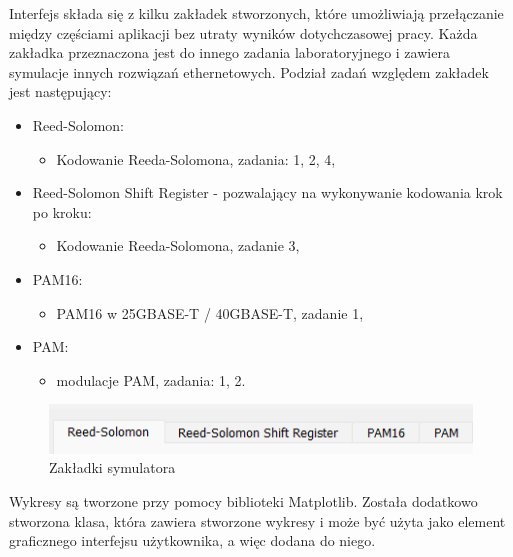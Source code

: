 Interfejs składa się z kilku zakładek stworzonych, które umożliwiają przełączanie między częściami aplikacji bez utraty wyników dotychczasowej pracy. Każda zakładka przeznaczona jest do innego zadania laboratoryjnego i zawiera symulacje innych rozwiązań ethernetowych. Podział zadań względem zakładek jest następujący:
\begin{itemize}
    \item Reed-Solomon:
    \begin{itemize}
        \item Kodowanie Reeda-Solomona, zadania: 1, 2, 4,
    \end{itemize}
    \item Reed-Solomon Shift Register - pozwalający na wykonywanie kodowania krok po kroku:
    \begin{itemize}
        \item Kodowanie Reeda-Solomona, zadanie 3,
    \end{itemize}
    \item PAM16:
    \begin{itemize}
        \item PAM16 w 25GBASE-T / 40GBASE-T, zadanie 1,
    \end{itemize}
    \item PAM:
    \begin{itemize}
        \item modulacje PAM, zadania: 1, 2.
    \end{itemize}
\end{itemize}

\begin{figure}[ht]
    \centering
    \includegraphics{images/zakladki.png}
    \caption{Zakładki symulatora}
    \label{fig:zakladki_image}
\end{figure}

Wykresy są tworzone przy pomocy biblioteki Matplotlib. Została dodatkowo stworzona klasa, która zawiera stworzone wykresy i może być użyta jako element graficznego interfejsu użytkownika, a więc dodana do niego.

